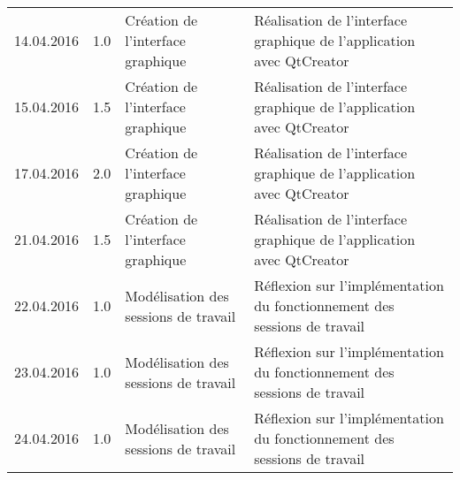 \documentclass[french]{article}
\begin{document}
\begin{longtable}{p{}|p{}|p{}|p{}}
		14.04.2016 & 1.0 & Création de l'interface graphique & Réalisation de l'interface graphique de l'application avec QtCreator\\
		15.04.2016 & 1.5 & Création de l'interface graphique & Réalisation de l'interface graphique de l'application avec QtCreator\\
		17.04.2016 & 2.0 & Création de l'interface graphique & Réalisation de l'interface graphique de l'application avec QtCreator\\
		\hline
		21.04.2016 & 1.5 & Création de l'interface graphique & Réalisation de l'interface graphique de l'application avec QtCreator\\
		22.04.2016 & 1.0 & Modélisation des sessions de travail & Réflexion sur l'implémentation du fonctionnement des sessions de travail\\
		23.04.2016 & 1.0 & Modélisation des sessions de travail & Réflexion sur l'implémentation du fonctionnement des sessions de travail\\
		24.04.2016 & 1.0 & Modélisation des sessions de travail & Réflexion sur l'implémentation du fonctionnement des sessions de travail\\
		
		
	\end{longtable}
	
\end{document}
